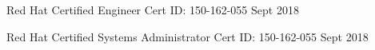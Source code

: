 

\begin{cvcerts}

  \cvcert
    {Red Hat Certified Engineer} %
    {Cert ID: 150-162-055} %
    {Sept 2018} %


  \cvcert
    {Red Hat Certified Systems Administrator} %
    {Cert ID: 150-162-055} %
    {Sept 2018} %


\end{cvcerts}

